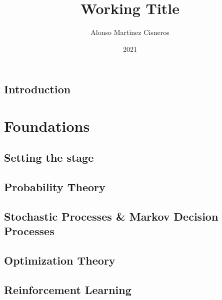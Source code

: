 \documentclass[colorful]{sty/itam-thesis}
\author{Alonso Martinez Cisneros}
\title{Working Title}
\date{2021}
\begin{document}
\frontmatter
{}
\maketitle
\makefrontmatter

\cleardoublepage
\pagestyle{plain}






\tableofcontents

\mainmatter


% 
\chapter*{Introduction}




\part{Foundations}

\chapter{Setting the stage}


\chapter{Probability Theory}
\chapter{Stochastic Processes \& Markov Decision Processes}
\chapter{Optimization Theory}
\chapter{Reinforcement Learning}

\nocite{*}
\printbibliography
\end{document}
